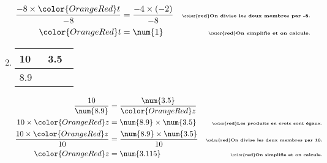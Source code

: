 \begin{corrige}
\begin{enumerate}
\begin{align*}
            \dfrac{-8\times {\color{OrangeRed} t}}{-8}  &= \dfrac{-4\times (-2)}{-8}         &\text{\tiny\bfseries\color{red}On divise les deux membres par -8.}\\
            {\color{OrangeRed} t}                     &=\num{1}                     &\text{\tiny\bfseries\color{red}On simplifie et on calcule.}
        \end{align*}        
        \item {\renewcommand{\arraystretch}{1.2}
            \begin{tabular}{|>{\centering\arraybackslash}m{0.1\linewidth}|>{\centering\arraybackslash}m{0.1\linewidth}|}
                \hline
                \num{10}&\num{3.5}\\\hline
                \num{8.9}&{\bfseries\color{OrangeRed}$z$ ?}\\\hline            
            \end{tabular}
        }\smallskip
        \begin{align*}
            \dfrac{10}{\num{8.9}}                              &=\dfrac{\num{3.5}}{\color{OrangeRed} z}&\\
            10\times {\color{OrangeRed} z}             &= \num{8.9}\times\num{3.5}                    &\text{\tiny\bfseries\color{red}Les produits en croix sont égaux.}\\
            \dfrac{10\times {\color{OrangeRed} z}}{10}  &= \dfrac{\num{8.9}\times\num{3.5}}{10}         &\text{\tiny\bfseries\color{red}On divise les deux membres par 10.}\\
            {\color{OrangeRed} z}                     &=\num{3.115}                     &\text{\tiny\bfseries\color{red}On simplifie et on calcule.}
        \end{align*}        
    \end{enumerate}    
\end{corrige}

